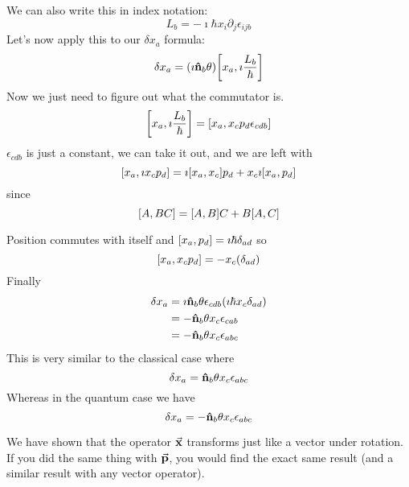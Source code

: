 \documentclass[a4paper,twoside,master.tex]{subfiles}
\begin{document}
We can also write this in index notation:
\begin{equation}
    L_b = - \imath \hbar x_i \partial_j \epsilon_{ijb}
\end{equation}
Let's now apply this to our $ \delta x_a $ formula:
\begin{equation}
    \delta x_a = (\imath\vu{ n}_b \theta) \comm{x_a}{\imath \frac{L_b}{\hbar}} 
\end{equation}
Now we just need to figure out what the commutator is.
\begin{equation}
    \comm{x_a}{\imath \frac{L_b}{\hbar}} = \comm{x_a}{x_c p_d \epsilon_{cdb}}
\end{equation}
$ \epsilon_{cdb} $ is just a constant, we can take it out, and we are left with
\begin{equation}
    \comm{x_a}{\imath x_c p_d} = \imath \comm{x_a}{x_c} p_d + x_c \imath \comm{x_a}{p_d}
\end{equation}
since
\begin{equation}
    \comm{A}{BC} = \comm{A}{B} C + B \comm{A}{C}
\end{equation}

Position commutes with itself and $ \comm{x_a}{p_d} = \imath \hbar \delta_{ad} $ so
\begin{equation}
    \comm{x_a}{x_c p_d} = -x_c(\delta_{ad})
\end{equation}
Finally
\begin{align}
    \delta x_a &= \imath\vu{ n}_b \theta \epsilon_{cdb} (\imath \hbar x_c \delta_{ad}) \\
    &= - \vu{ n}_b \theta x_c \epsilon_{cab} \\
    &= - \vu{ n}_b \theta x_c \epsilon_{abc}
\end{align}
This is very similar to the classical case where
\begin{equation}
    \delta x_a =\vu{ n}_b \theta x_c \epsilon_{abc}
\end{equation}
Whereas in the quantum case we have
\begin{equation}
    \delta x_a = - \vu{ n}_b \theta x_c \epsilon_{abc}
\end{equation}

We have shown that the operator $\va{ x} $ transforms just like a vector under rotation. If you did the same thing with $\va{ p} $, you would find the exact same result (and a similar result with any vector operator).
\end{document}
